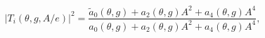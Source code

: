 \begin{equation}
\left\vert T_{i}(\theta ,g,A/e)\right\vert ^{2}=\frac{\tilde{a}_{0}(\theta
,g)+a_{2}(\theta ,g)A^{2}+a_{4}(\theta ,g)A^{4}}{a_{0}(\theta
,g)+a_{2}(\theta ,g)A^{2}+a_{4}(\theta ,g)A^{4}},  \label{tt}
\end{equation}

